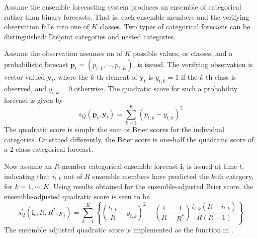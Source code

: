 \documentclass[article]{jss}
\begin{document}
Assume the ensemble forecasting system produces an ensemble of categorical rather than binary forecasts.
That is, each ensemble members and the verifying observation falls into one of $K$ classes.
Two types of categorical forecasts can be distinguished: Disjoint categories and nested categories.

Assume the observation assumes on of $K$ possible values, or classes, and a probabilistic forecast $\mathbf{p}_t = (p_{t,1}, \cdots, p_{t,K})$, is issued.
The verifying observation is vector-valued $\mathbf{y}_t$, where the $k$-th element of $\mathbf{y}_t$ is $y_{t,k}=1$ if the $k$-th class is observed, and $y_{t,k}=0$ otherwise.
The quadratic score for such a probability forecast is given by
%
\begin{equation}
s_{Q}(\mathbf{p}_t, \mathbf{y}_t) = \sum_{k=1}^K \left(p_{t,k} - y_{t,k}\right)^2
\end{equation}
%
The quadratic score is simply the sum of Brier scores for the individual categories.
Or stated differently, the Brier score is one-half the quadratic score of a 2-class categorical forecast.

Now assume an $R$-member categorical ensemble forecast $\mathbf{i}_t$ is issued at time $t$, indicating that $i_{t,k}$ out of $R$ ensemble members have predicted the $k$-th category, for $k=1,\cdots,K$.
Using results obtained for the ensemble-adjusted Brier score, the ensemble-adjusted quadratic score is seen to be
%
\begin{equation}
s_{Q}^*(\mathbf{i}_t, R, R^*, \mathbf{y}_t) = \sum_{k=1}^K \left\{ \left(\frac{i_{t,k}}{R} - y_{t,k}\right)^2 - \left(\frac{1}{R} - \frac{1}{R^*}\right) \frac{i_{t,k}(R-i_{t,k})}{R(R-1)}\right\}
\end{equation}
%
The ensemble adjusted quadratic score is implemented as the function  in .
\end{document}

